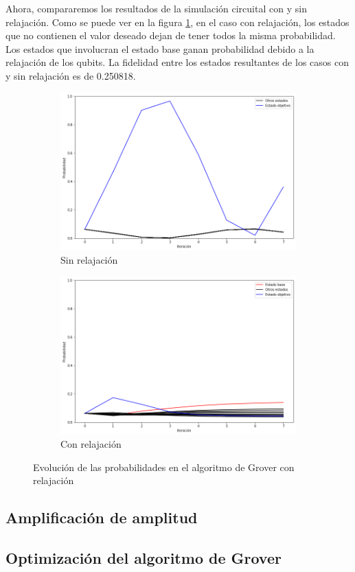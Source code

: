 Ahora, compararemos los resultados de la simulación circuital con y sin relajación. Como se puede ver en la figura \ref{fig:groverlosscomp}, en el caso con relajación, los estados que no contienen el valor deseado dejan de tener todos la misma probabilidad. Los estados que involucran el estado base ganan probabilidad debido a la relajación de los qubits. La fidelidad entre los estados resultantes de los casos con y sin relajación es de 0.250818.

\begin{figure}[H]
    \centering
    \begin{subfigure}[m]{0.49\textwidth}
        \centering
        \includegraphics[width=0.99\linewidth]{img/groveralllossless.png}
        \caption{Sin relajación}
    \end{subfigure}
    \begin{subfigure}[m]{0.49\textwidth}
        \centering
        \includegraphics[width=0.99\linewidth]{img/groverallloss.png}
        \caption{Con relajación}
    \end{subfigure}
    \caption[Evolución de las probabilidades en el algoritmo de Grover con relajación]{Evolución de las probabilidades en el algoritmo de Grover con relajación}
    \label{fig:groverlosscomp}
\end{figure}

\subsection{Amplificación de amplitud}

\subsection{Optimización del algoritmo de Grover}

